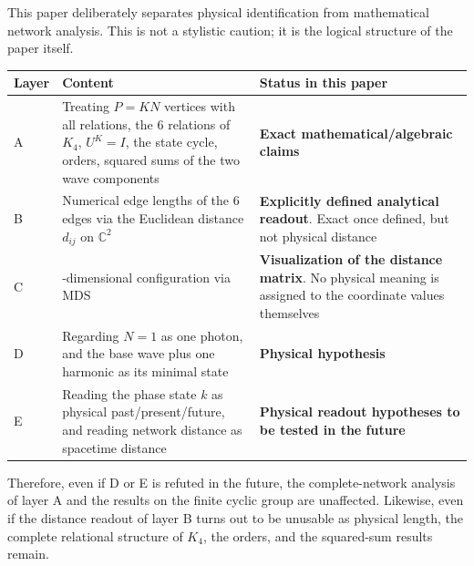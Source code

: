 \documentclass[
  a4paper,
]{article}
\newcounter{none} %
\begin{document}
This paper deliberately separates physical identification from
mathematical network analysis. This is not a stylistic caution; it is
the logical structure of the paper itself.

{\def\LTcaptype{none} %
\begin{longtable}[]{@{}
  >{\raggedright\arraybackslash}p{}
  >{\raggedright\arraybackslash}p{}
  >{\raggedright\arraybackslash}p{}@{}}
\toprule\noalign{}
\begin{minipage}[b]{\linewidth}\raggedright
Layer
\end{minipage} & \begin{minipage}[b]{\linewidth}\raggedright
Content
\end{minipage} & \begin{minipage}[b]{\linewidth}\raggedright
Status in this paper
\end{minipage} \\
\midrule\noalign{}
\endhead
\bottomrule\noalign{}
\endlastfoot
A & Treating \(P=KN\) vertices with all relations, the 6 relations of
\(K_4\), \(U^K=I\), the state cycle, orders, squared sums of the two
wave components & \textbf{Exact mathematical/algebraic claims} \\
B & Numerical edge lengths of the 6 edges via the Euclidean distance
\(d_{ij}\) on \(\mathbb C^2\) & \textbf{Explicitly defined analytical
readout}. Exact once defined, but not physical distance \\
C & 3-dimensional configuration via MDS & \textbf{Visualization of the
distance matrix}. No physical meaning is assigned to the coordinate
values themselves \\
D & Regarding \(N=1\) as one photon, and the base wave plus one harmonic
as its minimal state & \textbf{Physical hypothesis} \\
E & Reading the phase state \(k\) as physical past/present/future, and
reading network distance as spacetime distance & \textbf{Physical
readout hypotheses to be tested in the future} \\
\end{longtable}
}

Therefore, even if D or E is refuted in the future, the complete-network
analysis of layer A and the results on the finite cyclic group are
unaffected. Likewise, even if the distance readout of layer B turns out
to be unusable as physical length, the complete relational structure of
\(K_4\), the orders, and the squared-sum results remain.
\end{document}
